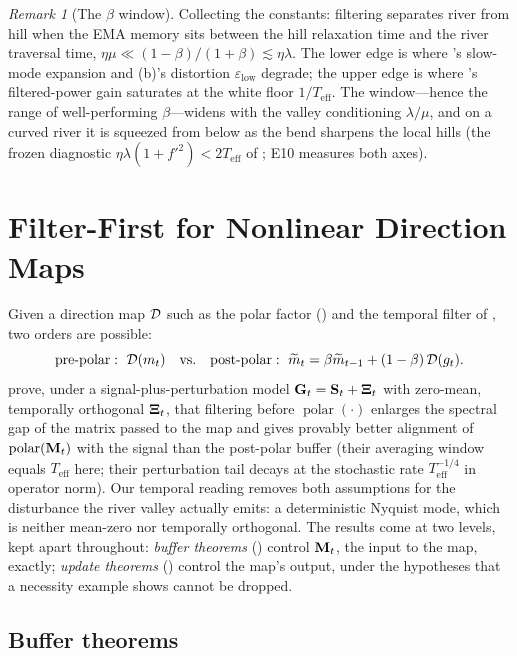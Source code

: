 \documentclass[11pt,a4paper]{article}
\theoremstyle{remark}
\newtheorem{remark}{Remark}
\newcommand{\Teff}{T_{\mathrm{eff}}}
\newcommand{\epslow}{\varepsilon_{\mathrm{low}}}
\DeclareMathOperator{\polar}{polar}
\begin{document}
\begin{remark}[The $\beta$ window]
\label{rem:window}
Collecting the constants: filtering separates river from hill when the EMA memory sits between the hill relaxation time and the river traversal time, $\eta\mu\ll(1-\beta)/(1+\beta)\lesssim\eta\lambda$.
The lower edge is where 's slow-mode expansion and (b)'s distortion $\epslow$ degrade; the upper edge is where 's filtered-power gain saturates at the white floor $1/\Teff$.
The window---hence the range of well-performing $\beta$---widens with the valley conditioning $\lambda/\mu$, and on a curved river it is squeezed from below as the bend sharpens the local hills (the frozen diagnostic $\eta\lambda(1+f'^2)<2\Teff$ of ; E10 measures both axes).
\end{remark}

\section{Filter-First for Nonlinear Direction Maps}
\label{sec:filterfirst}

Given a direction map $\mathcal{D}$ such as the polar factor () and the temporal filter of , two orders are possible:
\begin{equation}
\label{eq:orders}
\text{pre-polar}:\ \mathcal{D}(m_t)\quad\text{vs.}\quad
\text{post-polar}:\ \widetilde m_t=\beta\widetilde m_{t-1}+(1-\beta)\,\mathcal{D}(g_t).
\end{equation}
\citet{li2026denoise} prove, under a signal-plus-perturbation model $\mathbf{G}_t=\mathbf{S}_t+\bm{\Xi}_t$ with zero-mean, temporally orthogonal $\bm{\Xi}_t$, that filtering before $\polar(\cdot)$ enlarges the spectral gap of the matrix passed to the map and gives provably better alignment of $\polar(\Mbf_t)$ with the signal than the post-polar buffer (their averaging window equals $\Teff$ here; their perturbation tail decays at the stochastic rate $\Teff^{-1/4}$ in operator norm).
Our temporal reading removes both assumptions for the disturbance the river valley actually emits: a deterministic Nyquist mode, which is neither mean-zero nor temporally orthogonal.
The results come at two levels, kept apart throughout: \emph{buffer theorems} () control $\mathbf{M}_t$, the input to the map, exactly; \emph{update theorems} () control the map's output, under the hypotheses that a necessity example shows cannot be dropped.

\subsection{Buffer theorems}
\label{sec:buffer}
\end{document}
